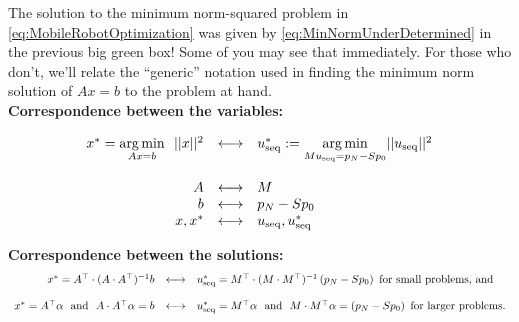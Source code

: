 \vspace*{.3cm}



\begin{tcolorbox}[sharp corners, colback=green!30, colframe=green!80!blue, title=\textbf{\Large Minimum Norm Solution to Steering a Robot}]

The solution to the minimum norm-squared problem in \eqref{eq:MobileRobotOptimization} was given by \eqref{eq:MinNormUnderDetermined} in the previous big green box! Some of you may see that immediately. For those who don't, we'll relate the ``generic'' notation used in finding the minimum norm solution of $Ax=b$ to the problem at hand. \\


\textbf{Correspondence between the variables:}

\begin{equation}
    \begin{array}{rcl}
       x^\ast = \underset{Ax=b}{\operatorname*{arg\,min}}~~||x||^2 & \longleftrightarrow &  u_{\rm seq}^\ast:= \underset{M u_{\rm seq} =  p_{N} - S p_0 }{\operatorname*{arg\,min}} ||u_{\rm seq}||^2\\
       \\
       A &\longleftrightarrow& M\\
       b &\longleftrightarrow& p_{N} - S p_0    \\
       x, x^\ast &\longleftrightarrow& u_{\rm seq}, u_{\rm seq}^\ast   
    \end{array}
\end{equation}

\vspace*{.4cm}

\textbf{Correspondence between the solutions:}
\begin{equation}
    \begin{array}{rcl}
            x^\ast = A^\top\cdot (A \cdot A^\top)^{-1} b  & \longleftrightarrow & u_{\rm seq}^\ast = M^\top  \cdot (M \cdot M^\top)^{-1}\left(p_{N} - S p_0\right) \text{ for small problems, and}\\   
            \\
x^\ast = A^\top \alpha~~\text{and}~~A\cdot A^\top \alpha =b & \longleftrightarrow & u_{\rm seq}^\ast = M^\top \alpha~~\text{and}~~M\cdot M^\top \alpha = \left( p_{N} - S p_0\right)    \text{ for larger problems.}  
    \end{array}
\end{equation}


\end{tcolorbox}
